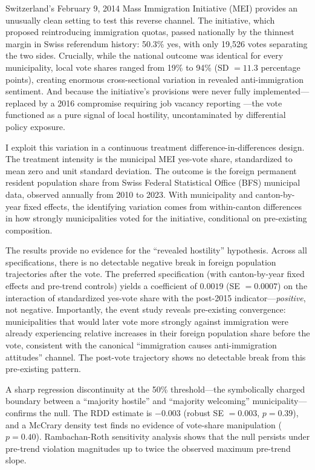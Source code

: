 \documentclass[12pt]{article}
\begin{document}
Switzerland's February 9, 2014 Mass Immigration Initiative (MEI) provides an unusually clean setting to test this reverse channel. The initiative, which proposed reintroducing immigration quotas, passed nationally by the thinnest margin in Swiss referendum history: 50.3\% yes, with only 19,526 votes separating the two sides. Crucially, while the national outcome was identical for every municipality, local vote shares ranged from 19\% to 94\% (SD $= 11.3$ percentage points), creating enormous cross-sectional variation in revealed anti-immigration sentiment. And because the initiative's provisions were never fully implemented---replaced by a 2016 compromise requiring job vacancy reporting \citep{piguet2019}---the vote functioned as a pure signal of local hostility, uncontaminated by differential policy exposure.

I exploit this variation in a continuous treatment difference-in-differences design. The treatment intensity is the municipal MEI yes-vote share, standardized to mean zero and unit standard deviation. The outcome is the foreign permanent resident population share from Swiss Federal Statistical Office (BFS) municipal data, observed annually from 2010 to 2023. With municipality and canton-by-year fixed effects, the identifying variation comes from within-canton differences in how strongly municipalities voted for the initiative, conditional on pre-existing composition.

The results provide no evidence for the ``revealed hostility'' hypothesis. Across all specifications, there is no detectable negative break in foreign population trajectories after the vote. The preferred specification (with canton-by-year fixed effects and pre-trend controls) yields a coefficient of $0.0019$ (SE $= 0.0007$) on the interaction of standardized yes-vote share with the post-2015 indicator---\textit{positive}, not negative. Importantly, the event study reveals pre-existing convergence: municipalities that would later vote more strongly against immigration were already experiencing relative increases in their foreign population share before the vote, consistent with the canonical ``immigration causes anti-immigration attitudes'' channel. The post-vote trajectory shows no detectable break from this pre-existing pattern.

A sharp regression discontinuity at the 50\% threshold---the symbolically charged boundary between a ``majority hostile'' and ``majority welcoming'' municipality---confirms the null. The RDD estimate is $-0.003$ (robust SE $= 0.003$, $p = 0.39$), and a McCrary density test finds no evidence of vote-share manipulation ($p = 0.40$). Rambachan-Roth sensitivity analysis shows that the null persists under pre-trend violation magnitudes up to twice the observed maximum pre-trend slope.
\end{document}
